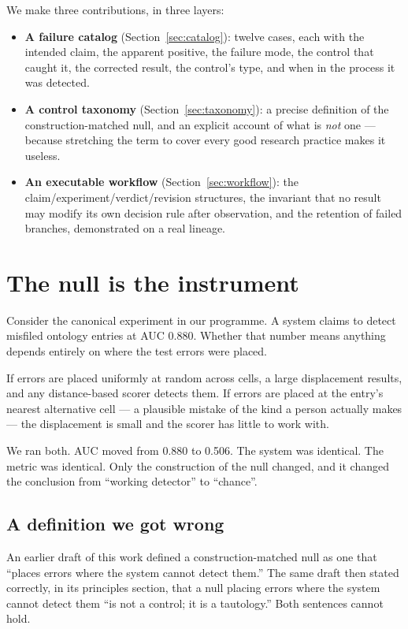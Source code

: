 \documentclass[11pt]{article}
\begin{document}
We make three contributions, in three layers:

\begin{itemize}
\item \textbf{A failure catalog} (Section~\ref{sec:catalog}): twelve cases,
  each with the intended claim, the apparent positive, the failure mode,
  the control that caught it, the corrected result, the control's type, and
  when in the process it was detected.
\item \textbf{A control taxonomy} (Section~\ref{sec:taxonomy}): a precise
  definition of the construction-matched null, and an explicit account of
  what is \emph{not} one --- because stretching the term to cover every good
  research practice makes it useless.
\item \textbf{An executable workflow} (Section~\ref{sec:workflow}): the
  claim/experiment/verdict/revision structures, the invariant that no result
  may modify its own decision rule after observation, and the retention of
  failed branches, demonstrated on a real lineage.
\end{itemize}

\section{The null is the instrument}
\label{sec:instrument}

Consider the canonical experiment in our programme. A system claims to
detect misfiled ontology entries at AUC 0.880. Whether that number means
anything depends entirely on where the test errors were placed.

If errors are placed uniformly at random across cells, a large displacement
results, and any distance-based scorer detects them. If errors are placed
at the entry's nearest alternative cell --- a plausible mistake of the kind
a person actually makes --- the displacement is small and the scorer has
little to work with.

We ran both. AUC moved from 0.880 to 0.506. The system was identical. The
metric was identical. Only the construction of the null changed, and it
changed the conclusion from ``working detector'' to ``chance''.

\subsection{A definition we got wrong}

An earlier draft of this work defined a construction-matched null as one
that ``places errors where the system cannot detect them.'' The same draft
then stated correctly, in its principles section, that a null placing
errors where the system cannot detect them ``is not a control; it is a
tautology.'' Both sentences cannot hold.
\end{document}
